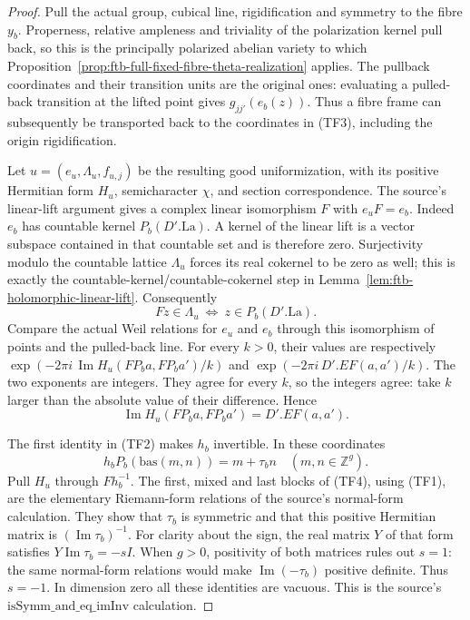 \begin{proof}
Pull the actual group, cubical line, rigidification and symmetry
to the fibre \(y_b\).  Properness, relative ampleness and
triviality of the polarization kernel pull back, so this is
the principally polarized abelian variety to which
Proposition~\ref{prop:ftb-full-fixed-fibre-theta-realization}
applies.  The pullback coordinates and their transition units
are the original ones: evaluating a pulled-back transition
at the lifted point gives \(g_{jj'}(e_b(z))\).
Thus a fibre frame can subsequently be transported back to
the coordinates in (TF3), including the origin
rigidification.

Let \(u=(e_u,\Lambda_u,f_{u,j})\) be the resulting good
uniformization, with its positive Hermitian form \(H_u\),
semicharacter \(\chi\), and section correspondence.
The source's linear-lift argument gives a complex linear
isomorphism \(F\) with \(e_uF=e_b\).
Indeed \(e_b\) has countable kernel \(P_b(D'.\mathrm{La})\).
A kernel of the linear lift is a vector subspace contained
in that countable set and is therefore zero.
Surjectivity modulo the countable lattice \(\Lambda_u\)
forces its real cokernel to be zero as well; this is exactly
the countable-kernel/countable-cokernel step in
Lemma~\ref{lem:ftb-holomorphic-linear-lift}.
Consequently
\[
 Fz\in\Lambda_u\ \Longleftrightarrow\
                  z\in P_b(D'.\mathrm{La}).
\]
Compare the actual Weil relations for \(e_u\) and \(e_b\)
through this isomorphism of points and the pulled-back
line.  For every \(k>0\), their values are respectively
\(\exp(-2\pi i\,\operatorname{Im}H_u(FP_ba,FP_ba')/k)\)
and \(\exp(-2\pi i\,D'.EF(a,a')/k)\).
The two exponents are integers.  They agree for every \(k\),
so the integers agree: take \(k\) larger than the absolute
value of their difference.  Hence
\[
 \operatorname{Im}H_u(FP_ba,FP_ba')=D'.EF(a,a').       \tag{TF4}
\]

The first identity in (TF2) makes \(h_b\) invertible.
In these coordinates
\[
 h_bP_b(\mathrm{bas}(m,n))=m+\tau_bn\quad(m,n\in\mathbb Z^g).
\]
Pull \(H_u\) through \(Fh_b^{-1}\).
The first, mixed and last blocks of (TF4), using (TF1),
are the elementary Riemann-form relations of
the source's normal-form calculation.
They show that \(\tau_b\) is symmetric and that this
positive Hermitian matrix is
\((\operatorname{Im}\tau_b)^{-1}\).
For clarity about the sign, the real matrix \(Y\) of that
form satisfies \(Y\operatorname{Im}\tau_b=-sI\).
When \(g>0\), positivity of both matrices rules out \(s=1\):
the same normal-form relations would make
\(\operatorname{Im}(-\tau_b)\) positive definite.
Thus \(s=-1\).  In dimension zero all these identities
are vacuous.  This is the source's
\(\mathrm{isSymm\_and\_eq\_imInv}\) calculation.


\end{proof}
